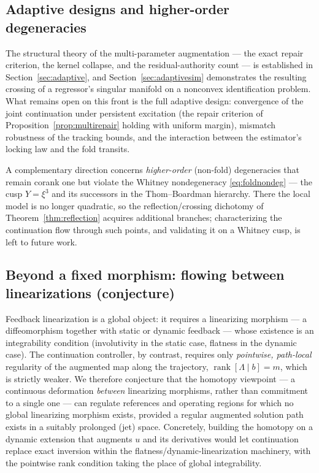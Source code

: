 \documentclass[11pt,american]{article}
\DeclareMathOperator{\rank}{\operatorname{rank}}
\theoremstyle{definition}
\theoremstyle{plain}
\theoremstyle{remark}
\begin{document}
\subsection{Adaptive designs and higher-order degeneracies}

The structural theory of the multi-parameter augmentation --- the exact repair criterion, the kernel collapse, and the residual-authority count --- is established in Section~\ref{sec:adaptive}, and Section~\ref{sec:adaptivesim} demonstrates the resulting crossing of a regressor's singular manifold on a nonconvex identification problem. What remains open on this front is the full adaptive design: convergence of the joint continuation under persistent excitation (the repair criterion of Proposition~\ref{prop:multirepair} holding with uniform margin), mismatch robustness of the tracking bounds, and the interaction between the estimator's locking law and the fold transits.

A complementary direction concerns \emph{higher-order} (non-fold) degeneracies that remain corank one but violate the Whitney nondegeneracy \eqref{eq:foldnondeg} --- the cusp $Y=\xi^3$ and its successors in the Thom--Boardman hierarchy. There the local model is no longer quadratic, so the reflection/crossing dichotomy of Theorem~\ref{thm:reflection} acquires additional branches; characterizing the continuation flow through such points, and validating it on a Whitney cusp, is left to future work.

\subsection{Beyond a fixed morphism: flowing between linearizations (conjecture)}

Feedback linearization is a global object: it requires a linearizing morphism --- a diffeomorphism together with static or dynamic feedback --- whose existence is an integrability condition (involutivity in the static case, flatness in the dynamic case). The continuation controller, by contrast, requires only \emph{pointwise, path-local} regularity of the augmented map along the trajectory, $\rank[\Lambda \mid b] = m$, which is strictly weaker. We therefore conjecture that the homotopy viewpoint --- a continuous deformation \emph{between} linearizing morphisms, rather than commitment to a single one --- can regulate references and operating regions for which no global linearizing morphism exists, provided a regular augmented solution path exists in a suitably prolonged (jet) space. Concretely, building the homotopy on a dynamic extension that augments $u$ and its derivatives would let continuation replace exact inversion within the flatness/dynamic-linearization machinery, with the pointwise rank condition taking the place of global integrability.
\end{document}
